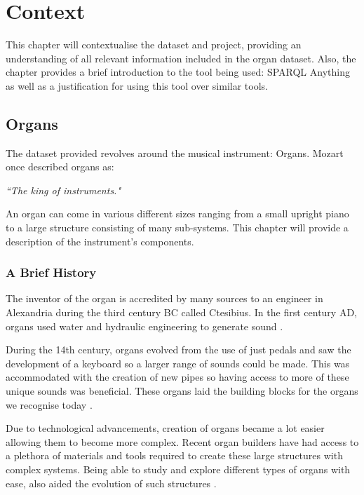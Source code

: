\chapter{Context}
This chapter will contextualise the dataset and project, providing an understanding of all relevant information included in the organ dataset. Also, the chapter provides a brief introduction to the tool being used: SPARQL Anything as well as a justification for using this tool over similar tools. 

\section{Organs}
\hspace{0.5cm} The dataset provided revolves around the musical instrument: Organs. Mozart once described organs as:

\vspace{-0.15cm}
\begin{displayquote}
    \textit{``The king of instruments."}
\end{displayquote}
\vspace{-0.15cm}

An organ can come in various different sizes ranging from a small upright piano to a large structure consisting of many sub-systems. This chapter will provide a description of the instrument's components.

\subsection{A Brief History}
\hspace{0.5cm} 
The inventor of the organ is accredited by many sources to an engineer in Alexandria during the third century BC called Ctesibius. In the first century AD, organs used water and hydraulic engineering to generate sound \cite{organhistory}.

During the 14th century, organs evolved from the use of just pedals and saw the development of a keyboard so a larger range of sounds could be made. This was accommodated with the creation of new pipes so having access to more of these unique sounds was beneficial. These organs laid the building blocks for the organs we recognise today \cite{organmedivalhistory}.

Due to technological advancements, creation of organs became a lot easier allowing them to become more complex. Recent organ builders have had access to a plethora of materials and tools required to create these large structures with complex systems. Being able to study and explore different types of organs with ease, also aided the evolution of such structures \cite{organhistory1}.

